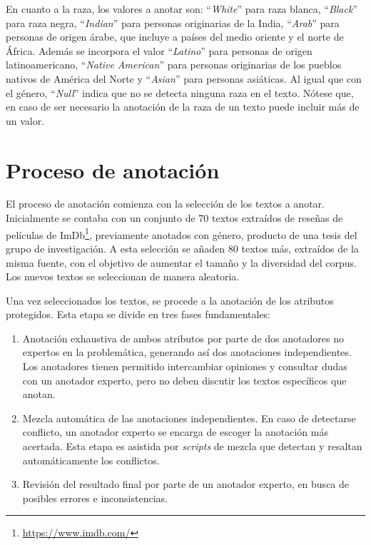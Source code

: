 En cuanto a la raza, los valores a anotar son: ``\emph{White}'' para raza blanca, ``\emph{Black}'' para raza negra, ``\emph{Indian}'' para 
personas originarias de la India, ``\emph{Arab}'' para personas de origen \'arabe, que incluye a pa\'ises del medio oriente y el norte de 
\'Africa. Adem\'as se incorpora el valor ``\emph{Latino}'' para personas de origen latinoamericano, ``\emph{Native American}'' para personas 
originarias de los pueblos nativos de Am\'erica del Norte y ``\emph{Asian}'' para personas asi\'aticas. Al igual que con el g\'enero, 
``\emph{Null}'' indica que no se detecta ninguna raza en el texto. N\'otese que, en caso de ser necesario la anotaci\'on de la raza de un 
texto puede incluir m\'as de un valor.

\section{Proceso de anotaci\'on}\label{section:annotation_process}
El proceso de anotaci\'on comienza con la selecci\'on de los textos a anotar. Inicialmente se contaba con un conjunto de 70 textos 
extra\'idos de rese\~nas de pel\'iculas de ImDb\footnote{\url{https://www.imdb.com/}}, previamente anotados con g\'enero, producto 
de una tesis del grupo de investigaci\'on. A esta selecci\'on se a\~naden 80 textos m\'as, extra\'idos de la misma fuente, con el 
objetivo de aumentar el tama\~no y la diversidad del corpus. Los nuevos textos se seleccionan de manera aleatoria.

Una vez seleccionados los textos, se procede a la anotaci\'on de los atributos protegidos. Esta etapa se divide en tres fases 
fundamentales:

\begin{enumerate}
    \item Anotaci\'on exhaustiva de ambos atributos por parte de dos anotadores no expertos en la problem\'atica, generando as\'i dos 
    anotaciones independientes. Los anotadores tienen permitido intercambiar opiniones y consultar dudas con un anotador experto, 
    pero no deben discutir los textos espec\'ificos que anotan.
    \item Mezcla autom\'atica de las anotaciones independientes. En caso de detectarse conflicto, un anotador experto se encarga de 
    escoger la anotaci\'on m\'as acertada. Esta etapa es asistida por \emph{scripts} de mezcla que detectan y resaltan autom\'aticamente
    los conflictos.
    \item Revisi\'on del resultado final por parte de un anotador experto, en busca de posibles errores e inconsistencias.
\end{enumerate}

